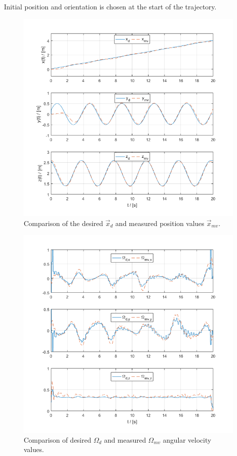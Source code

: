 \noindent Initial position and orientation is chosen at the start of the trajectory.

\newpage
\begin{figure}[h!]
	\centering
	\includegraphics[width=\columnwidth]{./pictures/mmc_traj_pos.png}
	\caption{Comparison of the desired $\vec{x}_d$ and measured position values $\vec{x}_{mv}$.}
	\label{fig:traj_pos}
\end{figure}

\begin{figure}[h!]
	\centering
	\includegraphics[width=\columnwidth]{./pictures/mmc_traj_omega.png}
	\caption{Comparison of desired $\Omega_d$ and measured $\Omega_{mv}$ angular velocity values.}
	\label{fig:traj_omega}
\end{figure}

